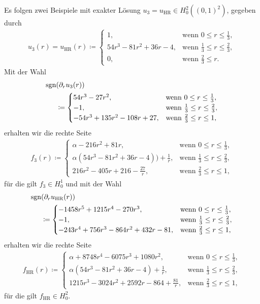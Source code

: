   Es folgen zwei Beispiele mit exakter Lösung $u_3=u_\textrm{HR} \in
  H^2_0((0,1)^2)$, gegeben durch 
\begin{align*}
  u_3(r)=u_\textrm{HR}(r)\coloneqq 
  \begin{cases}
    1, & \text{wenn } 0\leq r\leq\frac{1}{3},\\
    54r^3 - 81r^2 + 36r - 4, & 
    \text{wenn } \frac{1}{3}\leq r\leq \frac{2}{3},\\
    0, & \text{wenn } \frac{2}{3}\leq r.
  \end{cases}
\end{align*}
Mit der Wahl
\begin{align*}
  \operatorname{sgn}&(\partial_r u_3(r)) \\
  &\coloneqq 
  \begin{cases}
    54r^3-27r^2, & \text{wenn } 0\leq r\leq\frac{1}{3},\\
    -1, & \text{wenn } \frac{1}{3}\leq r\leq \frac{2}{3},\\
    -54r^3 + 135r^2 - 108r + 27, & \text{wenn } \frac{2}{3}\leq r\leq 1,
  \end{cases}
\end{align*}
erhalten wir die rechte Seite
\begin{align*}
  f_3(r)\coloneqq 
  \begin{cases}
    \alpha - 216r^2 + 81r, &
    \text{wenn } 0\leq r\leq\frac{1}{3},\\
    \alpha\left(54r^3 - 81r^2 + 36r - 4\right)) + \frac{1}{r}, & 
    \text{wenn } \frac{1}{3}\leq r\leq \frac{2}{3},\\
    216r^2 - 405r + 216 - \frac{27}{r}, & 
    \text{wenn } \frac{2}{3}\leq r\leq 1,
  \end{cases}
\end{align*}
für die gilt $f_3\in H^1_0$
und mit der Wahl
\begin{align*}
  \operatorname{sgn}&(\partial_r u_\textrm{HR}(r)) \\
  &\coloneqq 
  \begin{cases}
    -1458r^5 + 1215r^4 - 270r^3, & \text{wenn } 0\leq r\leq\frac{1}{3},\\
    -1, & \text{wenn } \frac{1}{3}\leq r\leq \frac{2}{3},\\
    -243r^4 + 756r^3 - 864r^2 + 432r - 81, 
    & \text{wenn } \frac{2}{3}\leq r\leq 1,
  \end{cases}
\end{align*}
erhalten wir die rechte Seite
\begin{align*}
  f_\textrm{HR}(r)\coloneqq 
  \begin{cases}
    \alpha + 8748r^4 - 6075r^3 + 1080r^2, &
    \text{wenn } 0\leq r\leq\frac{1}{3},\\
    \alpha\left(54r^3 - 81r^2 + 36r - 4\right) + \frac{1}{r}, & 
    \text{wenn } \frac{1}{3}\leq r\leq \frac{2}{3},\\
    1215r^3 - 3024r^2 + 2592r - 864 + \frac{81}{r}, & 
    \text{wenn } \frac{2}{3}\leq r\leq 1,
  \end{cases}
\end{align*}
für die gilt $f_\textrm{HR}\in H^2_0$.



